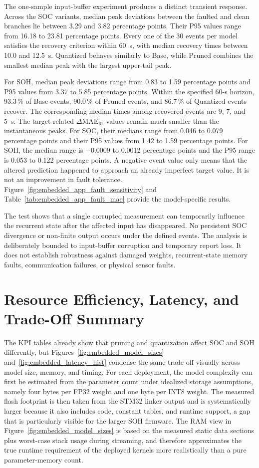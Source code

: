 \documentclass[
    a4paper,
    12pt,
    titlepage,
    bibliography=totoc,
    twoside=on,
    parskip=false,
    numbers=noenddot,
    cleardoublepage=empty,
    DIV=12,
    BCOR=12.0mm,
    headheight=36pt,
    headings=openright
]{scrreprt}
\begin{document}
The one-sample input-buffer experiment produces a distinct transient response. Across the SOC variants, median peak deviations between the faulted and clean branches lie between 3.29 and 3.82 percentage points. Their P95 values range from 16.18 to 23.81 percentage points. Every one of the 30 events per model satisfies the recovery criterion within 60~s, with median recovery times between 10.0 and 12.5~s. Quantized behaves similarly to Base, while Pruned combines the smallest median peak with the largest upper-tail peak.

For SOH, median peak deviations range from 0.83 to 1.59 percentage points and P95 values from 3.37 to 5.85 percentage points. Within the specified 60-s horizon, 93.3\,\% of Base events, 90.0\,\% of Pruned events, and 86.7\,\% of Quantized events recover. The corresponding median times among recovered events are 9, 7, and 5~s. The target-related $\Delta\mathrm{MAE}_{61}$ values remain much smaller than the instantaneous peaks. For SOC, their medians range from 0.046 to 0.079 percentage points and their P95 values from 1.42 to 1.59 percentage points. For SOH, the median range is $-0.0009$ to 0.0012 percentage points and the P95 range is 0.053 to 0.122 percentage points. A negative event value only means that the altered prediction happened to approach an already imperfect target value. It is not an improvement in fault tolerance. Figure~\ref{fig:embedded_app_fault_sensitivity} and Table~\ref{tab:embedded_app_fault_mae} provide the model-specific results.

The test shows that a single corrupted measurement can temporarily influence the recurrent state after the affected input has disappeared. No persistent SOC divergence or non-finite output occurs under the defined events. The analysis is deliberately bounded to input-buffer corruption and temporary report loss. It does not establish robustness against damaged weights, recurrent-state memory faults, communication failures, or physical sensor faults.

\section{Resource Efficiency, Latency, and Trade-Off Summary}
The KPI tables already show that pruning and quantization affect SOC and SOH differently, but Figures~\ref{fig:embedded_model_sizes} and~\ref{fig:embedded_latency_hist} condense the same trade-off visually across model size, memory, and timing. For each deployment, the model complexity can first be estimated from the parameter count under idealized storage assumptions, namely four bytes per FP32 weight and one byte per INT8 weight. The measured flash footprint is then taken from the STM32 linker output and is systematically larger because it also includes code, constant tables, and runtime support, a gap that is particularly visible for the larger SOH firmware. The RAM view in Figure~\ref{fig:embedded_model_sizes} is based on the measured static data sections plus worst-case stack usage during streaming, and therefore approximates the true runtime requirement of the deployed kernels more realistically than a pure parameter-memory count.
\end{document}
